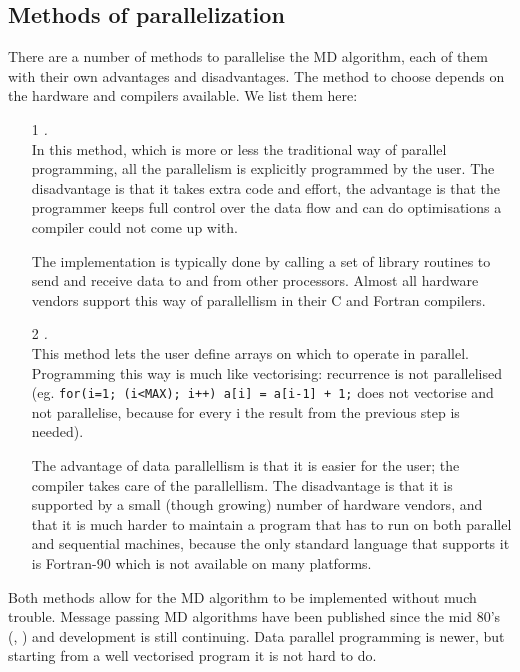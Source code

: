\subsection{Methods of parallelization}
There are a number of methods to parallelise the MD algorithm, each of
them with their own advantages and disadvantages. The method to 
choose depends on the hardware and compilers available.
We list them here:
\begin{enumerate}
\item[1]	{\em {}.}\\
		In this method, which is more or less the traditional
		way of parallel programming, all the parallelism is
		explicitly programmed by the user. The disadvantage
		is that it takes extra code and effort, the advantage
		is that the programmer keeps full control over the data
		flow and can do optimisations a compiler could not come 
		up with. 

		The implementation is typically done by calling a set of 
		library routines to send and receive data to and from 
		other processors. Almost all hardware vendors support 
		this way of
		parallellism in their C and Fortran compilers.
		
\item[2]	{\em {}.}\\
		This method lets the user define arrays on which to
		operate in parallel. Programming this way is much
		like vectorising: recurrence is not parallelised
		(eg. {\tt for(i=1; (i<MAX); i++) a[i] = a[i-1] + 1;}
		does not vectorise and not parallelise, because for
		every i the result from the previous step is needed).

		The advantage of data parallellism is that it is
		easier for the user; the compiler takes care of the
		parallellism. The disadvantage is that it is supported
		by a small (though growing) number of hardware vendors,
		and that it is much harder to maintain a program that has to
		run on both parallel and sequential machines, because
		the only standard language that supports it is Fortran-90
		which is not available on many platforms.
\end{enumerate}
Both methods allow for the MD algorithm to be implemented without much
trouble. Message passing MD algorithms have been published
since the mid 80's (\cite{Fincham87}, \cite{Raine89}) 
and development is still continuing. 
Data parallel programming is newer,
but starting from a well vectorised program it is not hard to do.

